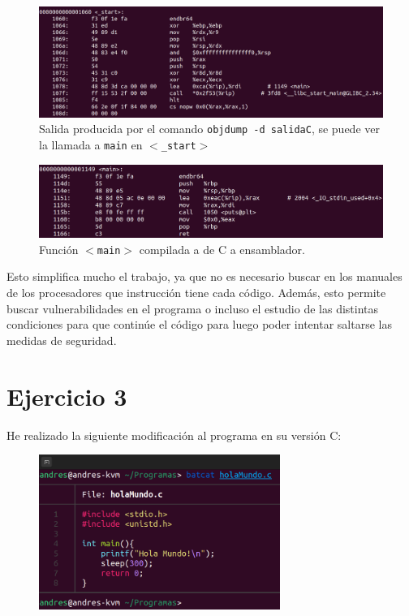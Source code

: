 \documentclass{article}
\begin{document}
\begin{figure}[H]
    \includegraphics[width=\textwidth]{imagenes/Captura desde 2022-11-17 17-53-55.png}
    \caption{Salida producida por el comando \texttt{objdump -d salidaC}, se puede ver la llamada a \texttt{main} en \texttt{$<$\_start$>$}}
\end{figure}


\begin{figure}[H]
    \includegraphics[width=\textwidth]{imagenes/Captura desde 2022-11-17 17-56-56.png}
    \caption{Función \texttt{$<$main$>$} compilada a de C a ensamblador.}
\end{figure}

Esto simplifica mucho el trabajo, ya que no es necesario buscar en los manuales de los procesadores que instrucción tiene cada código. Además, esto permite buscar vulnerabilidades en el programa o incluso el estudio de las distintas condiciones para que continúe el código para luego poder intentar saltarse las medidas de seguridad.

\bigskip

\section*{Ejercicio 3}

He realizado la siguiente modificación al programa en su versión C:

\begin{figure}[H]
    \centering
    \includegraphics[width=0.7\textwidth]{imagenes/Captura desde 2022-11-17 18-12-25.png}
\end{figure}
\end{document}
